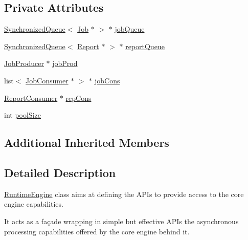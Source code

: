 \subsection*{Private Attributes}
\begin{DoxyCompactItemize}
\item 
\hyperlink{classit_1_1testbench_1_1rte_1_1SynchronizedQueue}{Synchronized\-Queue}$<$ \hyperlink{classit_1_1testbench_1_1rte_1_1Job}{Job} $\ast$ $>$ $\ast$ \hyperlink{classit_1_1testbench_1_1rte_1_1RuntimeEngine_ad56ac5fbd42f255b23c1cac3104c454a}{job\-Queue}
\item 
\hyperlink{classit_1_1testbench_1_1rte_1_1SynchronizedQueue}{Synchronized\-Queue}$<$ \hyperlink{classit_1_1testbench_1_1data_1_1Report}{Report} $\ast$ $>$ $\ast$ \hyperlink{classit_1_1testbench_1_1rte_1_1RuntimeEngine_aade3dfdae545b1bffdac3b2f2b82d1a9}{report\-Queue}
\item 
\hyperlink{classit_1_1testbench_1_1rte_1_1JobProducer}{Job\-Producer} $\ast$ \hyperlink{classit_1_1testbench_1_1rte_1_1RuntimeEngine_a4b4fdfac0c22969d1041c0a7b6cb11dc}{job\-Prod}
\item 
list$<$ \hyperlink{classit_1_1testbench_1_1rte_1_1JobConsumer}{Job\-Consumer} $\ast$ $>$ $\ast$ \hyperlink{classit_1_1testbench_1_1rte_1_1RuntimeEngine_a646520c7c1673cd9ddc86a27c19f161f}{job\-Cons}
\item 
\hyperlink{classit_1_1testbench_1_1rte_1_1ReportConsumer}{Report\-Consumer} $\ast$ \hyperlink{classit_1_1testbench_1_1rte_1_1RuntimeEngine_ab909a196ca42077e83c532959ec15850}{rep\-Cons}
\item 
int \hyperlink{classit_1_1testbench_1_1rte_1_1RuntimeEngine_a5e3a4289803ed9c4336285b170259c10}{pool\-Size}
\end{DoxyCompactItemize}
\subsection*{Additional Inherited Members}


\subsection{Detailed Description}
\hyperlink{classit_1_1testbench_1_1rte_1_1RuntimeEngine}{Runtime\-Engine} class aims at defining the A\-P\-Is to provide access to the core engine capabilities.

It acts as a façade wrapping in simple but effective A\-P\-Is the asynchronous processing capabilities offered by the core engine behind it.

